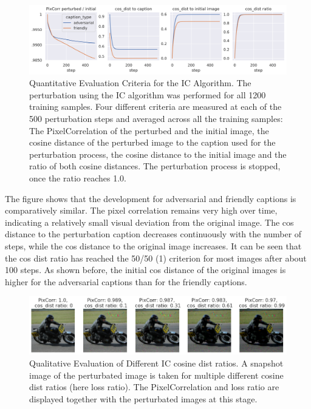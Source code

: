 \begin{figure}[ht]
    \centering
    \includegraphics[width=1\textwidth]{plots/advpert_validation_ic_loss_curves.png}
    \caption[Quantitative Evaluation Criteria for the IC Algorithm]{Quantitative Evaluation Criteria for the IC Algorithm. The perturbation using the IC algorithm was performed for all 1200 training samples. Four different criteria are measured at each of the 500 perturbation steps and averaged across all the training samples: The PixelCorrelation of the perturbed and the initial image, the cosine distance of the perturbed image to the caption used for the perturbation process, the cosine distance to the initial image and the ratio of both cosine distances. The perturbation process is stopped, once the ratio reaches 1.0.}\label{fig:advpert_validation_ic_loss_curves}
\end{figure}

The figure shows that the development for adversarial and friendly captions is comparatively similar. The pixel correlation remains very high over time, indicating a relatively small visual deviation from the original image. The cos distance to the perturbation caption decreases continuously with the number of steps, while the cos distance to the original image increases. It can be seen that the cos dist ratio has reached the 50/50 (1) criterion for most images after about 100 steps. As shown before, the initial cos distance of the original images is higher for the adversarial captions than for the friendly captions.


\begin{figure}[ht]
    \centering
    \includegraphics[width=1\textwidth]{plots/advpert_ic_qual_validation_evolution.png}
    \caption[Qualitative Evaluation of Different IC cosine dist ratios]{Qualitative Evaluation of Different IC cosine dist ratios. A snapshot image of the perturbated image is taken for multiple different cosine dist ratios (here loss ratio). The PixelCorrelation and loss ratio are displayed together with the perturbated images at this stage.}\label{fig:advpert_ic_qual_validation_evolution}
\end{figure}

